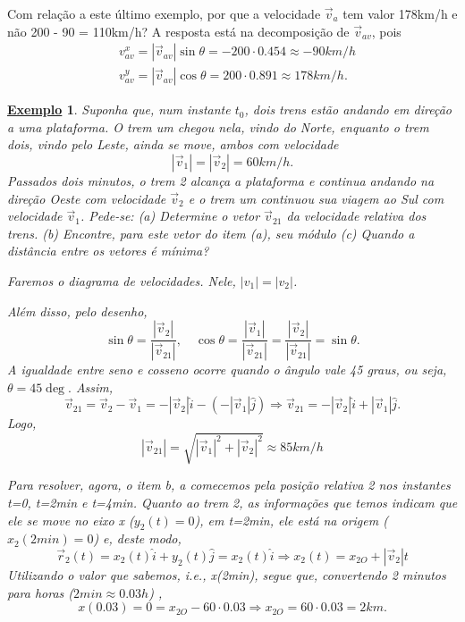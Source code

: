 \documentclass{article}
\newtheorem{example}{\underline{Exemplo}}
\begin{document}
  Com rela\c c\~ao a este \'ultimo exemplo, por que a velocidade $\vec{v}_{a}$ tem valor 178km/h e n\~ao 200 - 90 = 110km/h?
A resposta est\'a na decomposi\c c\~ao de $\vec{v}_{av}$, pois 
\begin{align*}
  &v_{av}^{x} = |\vec{v}_{av}|\sin{\theta} = -200 \cdot 0.454\approx -90km/h\\
  &v_{av}^{y} = |\vec{v}_{av}|\cos{\theta} = 200 \cdot 0.891\approx 178km/h.
\end{align*}
 \begin{example}
   Suponha que, num instante $t_{0}$, dois trens est\~ao andando em dire\c c\~ao a uma plataforma. O trem um chegou nela, vindo do Norte, enquanto o trem dois,
   vindo pelo Leste, ainda se move, ambos com velocidade 
     $$
       |\vec{v}_{1}| = |\vec{v}_{2}| = 60km/h.
     $$
     Passados dois minutos, o trem 2 alcan\c ca a plataforma e continua andando na dire\c c\~ao Oeste com velocidade $\vec{v}_{2}$ e o trem
    um continuou sua viagem ao Sul com velocidade $\vec{v}_{1}$. Pede-se: (a) Determine o vetor $\vec{v}_{21}$ da velocidade relativa dos trens. (b) Encontre, para este vetor do item (a), 
    seu m\'odulo (c) Quando a dist\^ancia entre os vetores \'e m\'inima?

    Faremos o diagrama de velocidades. Nele, $|v_{1}| = |v_{2}|$. 
\begin{center}
\end{center}
  Al\'em disso, pelo desenho, 
    $$
    \sin{\theta} = \frac{|\vec{v}_{2}|}{|\vec{v}_{21}|},\quad \cos{\theta} = \frac{|\vec{v}_{1}|}{|\vec{v}_{21}|} = \frac{|\vec{v}_{2}|}{|\vec{v}_{21}|} = \sin{\theta}.
    $$
    A igualdade entre seno e cosseno ocorre quando o \^angulo vale 45 graus, ou seja, $\theta = 45\deg.$ Assim,
     $$
     \vec{v}_{21} = \vec{v}_{2} - \vec{v}_{1} = -|\vec{v}_{2}|\hat{i} - (-|\vec{v}_{1}|\hat{j}) \Rightarrow \vec{v}_{21} = -|\vec{v}_{2}|\hat{i} + |\vec{v}_{1}|\hat{j}.
     $$
     Logo, 
       $$
       |\vec{v}_{21}| = \sqrt{|\vec{v}_{1}|^{2} + |\vec{v}_{2}|^{2}}\approx 85km/h
       $$

    Para resolver, agora, o item b, a comecemos pela posi\c c\~ao relativa 2 nos instantes t=0, t=2min e t=4min. Quanto ao trem 2, as
  informa\c c\~oes que temos indicam que ele se move no eixo x ($y_{2}(t) = 0$), em t=2min, ele est\'a na origem ($x_{2}(2min) = 0$) e, deste modo,
    $$
      \vec{r}_{2}(t) = x_{2}(t)\hat{i} + y_{2}(t)\hat{j} = x_{2}(t)\hat{i} \Rightarrow x_{2}(t) = x_{2O} + |\vec{v}_{2}|t
    $$
    Utilizando o valor que sabemos, i.e., x(2min), segue que, convertendo 2 minutos para horas ($2min\approx 0.03h$) ,
      $$
      x(0.03) = 0 = x_{2O} - 60 \cdot 0.03 \Rightarrow x_{2O} = 60 \cdot 0.03 = 2km.
      $$


\end{example}
\end{document}
